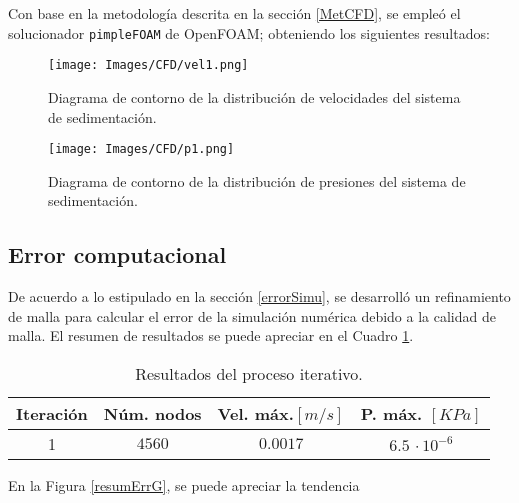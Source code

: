 \noindent
\justify

Con base en la metodolog\'ia descrita en la secci\'on \ref{MetCFD}, se emple\'o el solucionador \texttt{pimpleFOAM} de OpenFOAM; obteniendo los siguientes resultados:

\begin{figure}[h!]
	\centering
	\texttt{[image: Images/CFD/vel1.png]}
	\caption{Diagrama de contorno de la distribuci\'on de velocidades del sistema de sedimentaci\'on.}
	\label{CFD:vel}
\end{figure}

\begin{figure}[h!]
	\centering
	\texttt{[image: Images/CFD/p1.png]}
	\caption{Diagrama de contorno de la distribuci\'on de presiones del sistema de sedimentaci\'on.}
	\label{CFD:p}
\end{figure}

\subsection{Error computacional}

\noindent
\justify

De acuerdo a lo estipulado en la secci\'on \ref{errorSimu}, se desarroll\'o un refinamiento de malla para calcular el error de la simulaci\'on num\'erica debido a la calidad de malla. El resumen de resultados se puede apreciar en el Cuadro \ref{resumErr}.

\begin{table}[h!]
	\centering
	\begin{tabular}{|c|c|c|c|}
		\hline
		\textbf{Iteraci\'on} & \textbf{N\'um. nodos} & \textbf{Vel. m\'ax.$[m/s]$} & \textbf{P. m\'ax. $[KPa]$} \\ \hline
		1 & $4560$ & $0.0017$ & $6.5 \, \cdot 10 ^{-6}$ \\ \hline
	\end{tabular}
	\caption{Resultados del proceso iterativo.}
	\label{resumErr}
\end{table}

\noindent
\justify

En la Figura \ref{resumErrG}, se puede apreciar la tendencia 